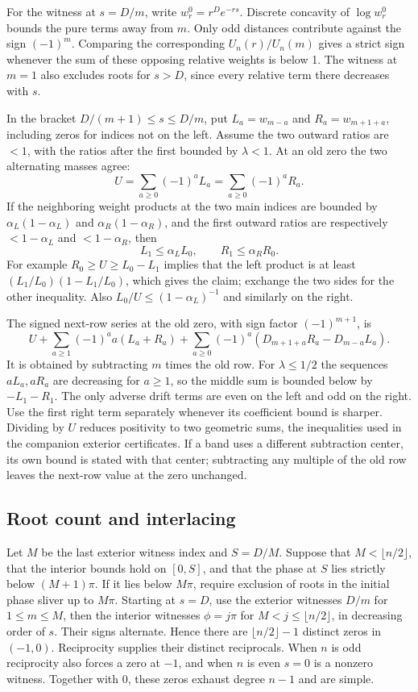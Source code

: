 \documentclass[11pt,reqno]{amsart}
\theoremstyle{remark}
\begin{document}
For the witness at $s=D/m$, write $w_r^0=r^D e^{-rs}$. Discrete concavity of $\log w_r^0$ bounds the pure terms away from $m$. Only odd distances contribute against the sign $(-1)^m$. Comparing the corresponding $U_n(r)/U_n(m)$ gives a strict sign whenever the sum of these opposing relative weights is below 1. The witness at $m=1$ also excludes roots for $s>D$, since every relative term there decreases with $s$.

In the bracket $D/(m+1)\le s\le D/m$, put $L_a=w_{m-a}$ and $R_a=w_{m+1+a}$, including zeros for indices not on the left. Assume the two outward ratios are $<1$, with the ratios after the first bounded by $\lambda<1$. At an old zero the two alternating masses agree:
\[
 U=\sum_{a\ge0}(-1)^aL_a=\sum_{a\ge0}(-1)^aR_a .
\]
If the neighboring weight products at the two main indices are bounded by $\alpha_L(1-\alpha_L)$ and $\alpha_R(1-\alpha_R)$, and the first outward ratios are respectively $<1-\alpha_L$ and $<1-\alpha_R$, then
\[
 L_1\le\alpha_L L_0,\qquad R_1\le\alpha_RR_0.
\]
For example $R_0\ge U\ge L_0-L_1$ implies that the left product is at least $(L_1/L_0)(1-L_1/L_0)$, which gives the claim; exchange the two sides for the other inequality. Also $L_0/U\le (1-\alpha_L)^{-1}$ and similarly on the right.

The signed next-row series at the old zero, with sign factor $(-1)^{m+1}$, is
\begin{equation}\label{eq:mean}
 U+\sum_{a\ge1}(-1)^a a(L_a+R_a)+
      \sum_{a\ge0}(-1)^a(D_{m+1+a}R_a-D_{m-a}L_a).
\end{equation}
It is obtained by subtracting $m$ times the old row. For $\lambda\le 1/2$ the sequences $aL_a,aR_a$ are decreasing for $a\ge1$, so the middle sum is bounded below by $-L_1-R_1$. The only adverse drift terms are even on the left and odd on the right. Use the first right term separately whenever its coefficient bound is sharper. Dividing by $U$ reduces positivity to two geometric sums, the inequalities used in the companion exterior certificates. If a band uses a different subtraction center, its own bound is stated with that center; subtracting any multiple of the old row leaves the next-row value at the zero unchanged.

\subsection{Root count and interlacing}
Let $M$ be the last exterior witness index and $S=D/M$. Suppose that $M<\lfloor n/2\rfloor$, that the interior bounds hold on $[0,S]$, and that the phase at $S$ lies strictly below $(M+1)\pi$. If it lies below $M\pi$, require exclusion of roots in the initial phase sliver up to $M\pi$. Starting at $s=D$, use the exterior witnesses $D/m$ for $1\le m\le M$, then the interior witnesses $\phi=j\pi$ for $M<j\le\lfloor n/2\rfloor$, in decreasing order of $s$. Their signs alternate. Hence there are $\lfloor n/2\rfloor-1$ distinct zeros in $(-1,0)$. Reciprocity supplies their distinct reciprocals. When $n$ is odd reciprocity also forces a zero at $-1$, and when $n$ is even $s=0$ is a nonzero witness. Together with $0$, these zeros exhaust degree $n-1$ and are simple.
\end{document}
